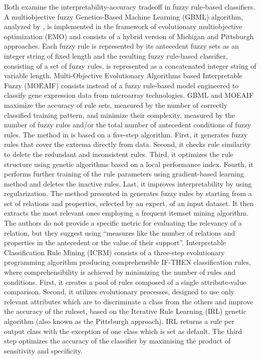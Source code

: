 \documentclass[final,1p,times]{elsarticle}
\begin{document}
Both \cite{ishibuchi2007analysis, wang2011building} examine the interpretability-accuracy tradeoff in fuzzy rule-based classifiers. A multiobjective fuzzy Genetics-Based Machine Learning (GBML) algorithm, analyzed by \cite{ishibuchi2007analysis}, is implemented in the framework of evolutionary multiobjective optimization (EMO) and consists of a hybrid version of Michigan and Pittsburgh approaches. Each fuzzy rule is represented by its antecedent fuzzy sets as an integer string of fixed length and the resulting fuzzy rule-based classifier, consisting of a set of fuzzy rules, is represented as a concatenated integer string of variable length. Multi-Objective Evolutionary Algorithms based Interpretable Fuzzy (MOEAIF) \cite{wang2011building} consists instead of a fuzzy rule-based model engineered to classify gene expression data from microarray technologies. GBML and MOEAIF maximize the accuracy of rule sets, measured by the number of correctly classified training pattern, and minimize their complexity, measured by the number of fuzzy rules and/or the total number of antecedent conditions of fuzzy rules. 
The method in \cite{jin2000fuzzy} is based on a five-step algorithm. First, it generates fuzzy rules that cover the extrema directly from data. Second, it checks rule similarity to delete the redundant and inconsistent rules. Third, it optimizes the rule structure using genetic algorithms based on a local performance index. Fourth, it performs further training of the rule parameters using gradient-based learning method and deletes the inactive rules. Last, it improves interpretability by using regularization.
The method presented in \cite{pierrard2018learning} generates fuzzy rules by starting from a set of relations and properties, selected by an expert, of an input dataset. It then extracts the most relevant ones employing a frequent itemset mining algorithm. The authors do not provide a specific metric for evaluating the relevancy of a relation, but they suggest using ``measures like the number of relations and properties in the antecedent or the value of their support''.
Interpretable Classification Rule Mining (ICRM) \cite{cano2013interpretable} consists of a three-step evolutionary programming algorithm producing comprehensible IF-THEN classification rules, where comprehensibility is achieved by minimizing the number of rules and conditions. First, it creates a pool of rules composed of a single attribute-value comparison. Second, it utilizes evolutionary processes, designed to use only relevant attributes which are to discriminate a class from the others and improve the accuracy of the ruleset, based on the Iterative Rule Learning (IRL) genetic algorithm (also known as the Pittsburgh approach). IRL returns a rule per output class with the exception of one class which is set as default. The third step optimizes the accuracy of the classifier by maximising the product of sensitivity and specificity.
\end{document}
